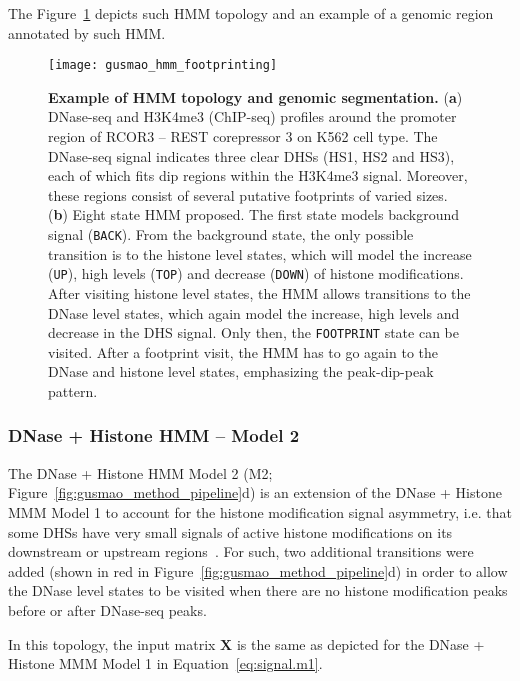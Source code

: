The Figure~\ref{fig:gusmao_hmm_footprinting} depicts such HMM topology and an example of a genomic region annotated by such HMM.

\begin{figure}[h!]
\centering
\texttt{[image: gusmao\_hmm\_footprinting]}
\caption[Example of HMM topology and genomic segmentation]{\textbf{Example of HMM topology and genomic segmentation.} (\textbf{a}) DNase-seq and H3K4me3 (ChIP-seq) profiles around the promoter region of RCOR3 -- REST corepressor 3 on K562 cell type. The DNase-seq signal indicates three clear DHSs (HS1, HS2 and HS3), each of which fits dip regions within the H3K4me3 signal. Moreover, these regions consist of several putative footprints of varied sizes. (\textbf{b}) Eight state HMM proposed. The first state models background signal ({\tt BACK}). From the background state, the only possible transition is to the histone level states, which will model the increase ({\tt UP}), high levels ({\tt TOP}) and decrease ({\tt DOWN}) of histone modifications. After visiting histone level states, the HMM allows transitions to the DNase level states, which again model the increase, high levels and decrease in the DHS signal. Only then, the {\tt FOOTPRINT} state can be visited. After a footprint visit, the HMM has to go again to the DNase and histone level states, emphasizing the peak-dip-peak pattern.}
\label{fig:gusmao_hmm_footprinting}
\end{figure}

\subsubsection{DNase + Histone HMM -- Model 2}

The DNase + Histone HMM Model 2 (M2; Figure~\ref{fig:gusmao_method_pipeline}d) is an extension of the DNase + Histone MMM Model 1 to account for the histone modification signal asymmetry, i.e. that some DHSs have very small signals of active histone modifications on its downstream or upstream regions~\cite{kundaje2012}. For such, two additional transitions were added (shown in red in Figure~\ref{fig:gusmao_method_pipeline}d) in order to allow the DNase level states to be visited when there are no histone modification peaks before or after DNase-seq peaks.

In this topology, the input matrix $\mathbf{X}$ is the same as depicted for the DNase + Histone MMM Model 1 in Equation~\ref{eq:signal.m1}.

